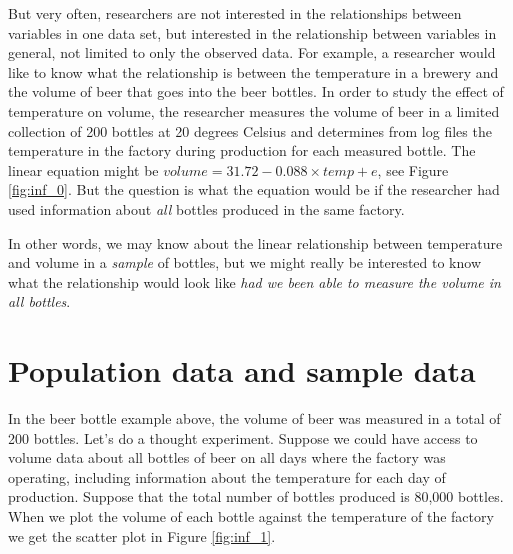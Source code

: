 \documentclass[]{book}\usepackage[]{graphicx}\usepackage[]{color}
\begin{document}
But very often, researchers are not interested in the relationships between variables in one data set, but interested in the relationship between variables in general, not limited to only the observed data. For example, a researcher would like to know what the relationship is between the temperature in a brewery and the volume of beer that goes into the beer bottles. In order to study the effect of temperature on volume, the researcher measures the volume of beer in a limited collection of 200 bottles at 20 degrees Celsius and determines from log files the temperature in the factory during production for each measured bottle. The linear equation might be $volume = 31.72 -0.088 \times temp + e$, see Figure \ref{fig:inf_0}. But the question is what the equation would be if the researcher had used information about \textit{all} bottles produced in the same factory.



In other words, we may know about the linear relationship between temperature and volume in a \textit{sample} of bottles, but we might really be interested to know what the relationship would look like \textit{had we been able to measure the volume in all bottles}.


\section{Population data and sample data}

In the beer bottle example above, the volume of beer was measured in a total of 200 bottles. Let's do a thought experiment. Suppose we could have access to volume data about all bottles of beer on all days where the factory was operating, including information about the temperature for each day of production. Suppose that the total number of bottles produced is 80,000 bottles. When we plot the volume of each bottle against the temperature of the factory we get the scatter plot in Figure \ref{fig:inf_1}.
\end{document}
